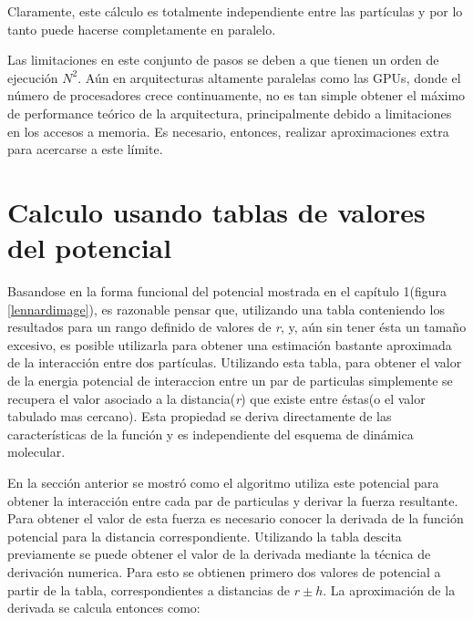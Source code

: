 Claramente, este cálculo es totalmente independiente entre las partículas y por lo tanto puede hacerse completamente en paralelo.



Las limitaciones en este conjunto de pasos se deben a que tienen un orden de ejecución $N^2$. Aún en arquitecturas altamente paralelas como las GPUs, donde el número de procesadores crece continuamente, 
no es tan simple obtener el máximo de performance teórico de la arquitectura, principalmente debido a limitaciones en los accesos a memoria.
Es necesario, entonces, realizar aproximaciones extra para acercarse a este límite.




\section{Calculo usando tablas de valores del potencial }


Basandose en la forma funcional del potencial mostrada en el capítulo 1(figura \ref{lennardimage}), es razonable pensar que, utilizando una tabla conteniendo los resultados para un rango definido de valores de \textit{r}, y, 
aún sin tener ésta un tamaño excesivo, es posible utilizarla para obtener una estimación bastante aproximada de la interacción entre dos partículas. 
Utilizando esta tabla, para obtener el valor de la energia potencial de interaccion entre un par de particulas simplemente se recupera el valor asociado a la distancia(\textit{r}) que existe entre éstas(o el valor tabulado mas cercano).
Esta propiedad se deriva directamente de las características de la función y es independiente del esquema de dinámica molecular.



En la sección anterior se mostró como el algoritmo utiliza este potencial para obtener la interacción entre cada par de particulas y derivar la fuerza resultante. 
Para obtener el valor de esta fuerza es necesario conocer la derivada de la función potencial para la distancia correspondiente.
Utilizando la tabla descita previamente se puede obtener el valor de la derivada mediante la técnica de derivación numerica. 
Para esto se obtienen primero dos valores de potencial a partir de la tabla, correspondientes a distancias de $r\pm h$. 
La aproximación de la derivada se calcula entonces como:

